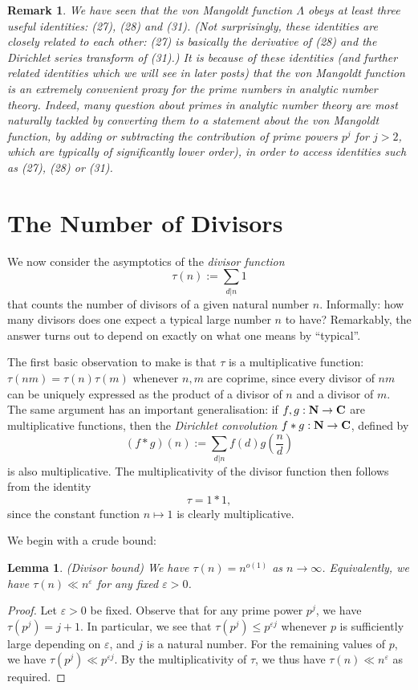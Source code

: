 \documentclass[10pt,reqno]{amsart}
\newtheorem{lemma}[theorem]{Lemma}
\newtheorem{remark}[theorem]{Remark}
\begin{document}
\begin{remark}
    We have seen that the von Mangoldt function $\Lambda$ obeys at least three useful identities: (27), (28) and (31). (Not surprisingly, these identities are closely related to each other: (27) is basically the derivative of (28) and the Dirichlet series transform of (31).) It is because of these identities (and further related identities which we will see in later posts) that the von Mangoldt function is an extremely convenient proxy for the prime numbers in analytic number theory. Indeed, many question about primes in analytic number theory are most naturally tackled by converting them to a statement about the von Mangoldt function, by adding or subtracting the contribution of prime powers $p^j$ for $j>2$, which are typically of significantly lower order), in order to access identities such as (27), (28) or (31).
\end{remark}

\section{The Number of Divisors}

We now consider the asymptotics of the \emph{divisor function}
%
\[  \tau(n) := \sum_{d|n} 1\]
%
that counts the number of divisors of a given natural number $n$. Informally: how many divisors does one expect a typical large number $n$ to have? Remarkably, the answer turns out to depend on exactly on what one means by “typical”.

The first basic observation to make is that $\tau$ is a multiplicative function: $\tau(nm) = \tau(n) \tau(m)$ whenever $n,m$ are coprime, since every divisor of $nm$ can be uniquely expressed as the product of a divisor of $n$ and a divisor of $m$. The same argument has an important generalisation: if $f,g: {\bf N}\rightarrow {\bf C}$ are multiplicative functions, then the \emph{Dirichlet convolution} $f*g: {\bf N} \rightarrow {\bf C}$, defined by
%
\[  (f*g)(n) := \sum_{d|n} f(d) g \left(\frac{n}{d} \right)\]
%
is also multiplicative. The multiplicativity of the divisor function then follows from the identity
%
\[  \tau = 1 * 1,\]
%
since the constant function $n \mapsto 1$ is clearly multiplicative.

We begin with a crude bound:

\begin{lemma} (Divisor bound) We have $\tau(n) = n^{o(1)}$ as $n \rightarrow \infty$. Equivalently, we have $\tau(n) \ll n^\varepsilon$ for any fixed $\varepsilon>0$.
\end{lemma}
\begin{proof}
    Let $\varepsilon > 0$ be fixed. Observe that for any prime power $p^j$, we have $\tau(p^j) = j+1$. In particular, we see that $\tau(p^j) \leq p^{\varepsilon j}$ whenever $p$ is sufficiently large depending on $\varepsilon$, and $j$ is a natural number. For the remaining values of $p$, we have $\tau(p^j) \ll p^{\varepsilon j}$. By the multiplicativity of $\tau$, we thus have $\tau(n) \ll n^\varepsilon$ as required. %
\end{proof}
\end{document}
